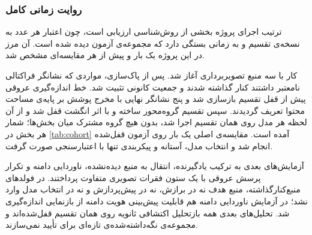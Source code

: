 \subsubsection{روایت زمانی کامل}

ترتیب اجرای پروژه بخشی از روش‌شناسی ارزیابی است، چون اعتبار هر عدد به نسخه‌ی تقسیم و به زمانی بستگی دارد که مجموعه‌ی آزمون دیده شده است. آن مرز در این پروژه یک بار و پیش از هر مقایسه‌ای مشخص شد.

کار با سه منبع تصویربرداری آغاز شد. پس از پاک‌سازی، مواردی که نشانگر فراکتالی نامعتبر داشتند کنار گذاشته شدند و جمعیت کانونی تثبیت شد. خط اندازه‌گیری عروقی پیش از قفل تقسیم بازسازی شد و پنج نشانگر نهایی با مخرج پوشش بر پایه‌ی مساحت محتوا تعریف گردیدند. سپس تقسیم گروه‌محور ساخته و با اثر انگشت قفل شد و از آن لحظه هر مدل روی همان تقسیم اجرا شد، بدون هیچ گروه مشترک میان بخش‌ها؛ شمار هر بخش در \autoref{tab:cohort} آمده است. مقایسه‌ی اصلی یک بار روی آزمون قفل‌شده انجام شد و انتخاب مدل، آستانه و پیکربندی تنها با اعتبارسنجی صورت گرفت.

آزمایش‌های بعدی به ترکیب یادگیرنده، انتقال به منبع دیده‌نشده، ناوردایی دامنه و تکرار پرسش عروقی با یک ستون فقرات تصویری متفاوت پرداختند. در فولدهای منبع‌کنارگذاشته، منبع هدف نه در برازش، نه در پیش‌پردازش و نه در انتخاب مدل وارد نشد؛ در آزمایش ناوردایی دامنه هم قابلیت پیش‌بینی هویت دامنه از بازنمایی اندازه‌گیری شد. تحلیل‌های بعدی همه بازتحلیل اکتشافی ثانویه روی همان تقسیم قفل‌شده‌اند و مجموعه‌ی نگه‌داشته‌شده‌ی تازه‌ای برای تأیید نمی‌سازند.
